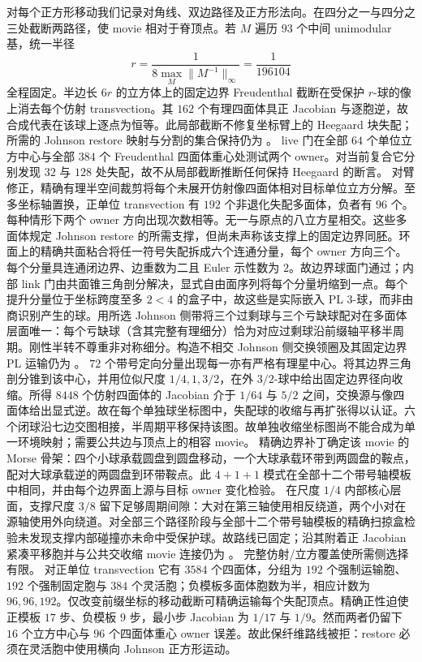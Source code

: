 对每个正方形移动我们记录对角线、双边路径及正方形法向。在四分之一与四分之三处截断两路径，使 movie 相对于脊顶点。若 $M$ 遍历 $93$ 个中间 unimodular 基，统一半径
\[
r=\frac{1}{8\max_M\lVert M^{-1}\rVert_\infty}=\frac1{196104}
\]
全程固定。半边长 $6r$ 的立方体上的固定边界 Freudenthal 截断在受保护 $r$-球的像上消去每个仿射 transvection。其 $162$ 个有理四面体具正
Jacobian 与逐胞逆，故合成代表在该球上逐点为恒等。此局部截断不修复坐标臂上的 Heegaard
块失配；所需的 Johnson restore 映射与分割的集合保持仍为 \Open。
live 门在全部 $64$ 个单位立方中心与全部 $384$ 个
Freudenthal 四面体重心处测试两个 owner。对当前复合它分别发现 $32$
与 $128$ 处失配，故不从局部截断推断任何保持 Heegaard 的断言。
对臂修正，精确有理半空间裁剪将每个未展开仿射像四面体相对目标单位立方分解。至多坐标轴置换，正单位 transvection 有 $192$ 个非退化失配多面体，负者有 $96$ 个。每种情形下两个 owner 方向出现次数相等。无一与原点的八立方星相交。这些多面体规定 Johnson restore 的所需支撑，但尚未声称该支撑上的固定边界同胚。环面上的精确共面粘合将任一符号失配拆成六个连通分量，每个 owner 方向三个。每个分量具连通闭边界、边重数为二且 Euler 示性数为 $2$。故边界球面门通过；内部 link 门由共面锥三角剖分解决，显式自由面序列将每个分量坍缩到一点。每个提升分量位于坐标跨度至多 $2<4$ 的盒子中，故这些是实际嵌入 PL $3$-球，而非由商识别产生的球。用所选 Johnson 侧带将三个过剩球与三个亏缺球配对在多面体层面唯一：每个亏缺球（含其完整有理细分）恰为对应过剩球沿前缀轴平移半周期。刚性半转不尊重非对称细分。构造不相交 Johnson 侧交换领圈及其固定边界 PL 运输仍为
\Open。
$72$ 个带号定向分量出现每一亦有严格有理星中心。将其边界三角剖分锥到该中心，并用位似尺度 $1/4,1,3/2$，在外 $3/2$-球中给出固定边界径向收缩。所得 $8448$ 个仿射四面体的 Jacobian 介于 $1/64$ 与 $5/2$ 之间，交换源与像四面体给出显式逆。故在每个单独球坐标图中，失配球的收缩与再扩张得以认证。六个闭球沿七边交图相接，半周期平移保持该图。故单独收缩坐标图尚不能合成为单一环境映射；需要公共边与顶点上的相容 movie。
精确边界补丁确定该 movie 的 Morse 骨架：四个小球承载圆盘到圆盘移动，一个大球承载环带到两圆盘的鞍点，配对大球承载逆的两圆盘到环带鞍点。此 $4+1+1$ 模式在全部十二个带号轴模板中相同，并由每个边界面上源与目标 owner 变化检验。
在尺度 $1/4$ 内部核心层面，支撑尺度 $3/8$ 留下足够周期间隙：大对在第三轴使用相反绕道，两个小对在源轴使用外向绕道。对全部三个路径阶段与全部十二个带号轴模板的精确扫掠盒检验未发现支撑内部碰撞亦未命中受保护球。故路线已固定；沿其附着正 Jacobian 紧凑平移胞并与公共交收缩 movie 连接仍为 \Open。
完整仿射/立方覆盖使所需侧选择有限。
对正单位 transvection 它有 $3584$ 个四面体，分组为 $192$ 个强制运输胞、$192$ 个强制固定胞与 $384$ 个灵活胞；负模板多面体胞数为半，相应计数为 $96,96,192$。仅改变前缀坐标的移动截断可精确运输每个失配顶点。精确正性迫使正模板 $17$ 步、负模板 $9$ 步，最小步 Jacobian 为 $1/17$ 与 $1/9$。然而两者仍留下 $16$ 个立方中心与 $96$ 个四面体重心 owner 误差。故此保纤维路线被拒：restore 必须在灵活胞中使用横向 Johnson 正方形运动。
